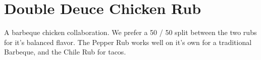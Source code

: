 \section[Double Deuce]{Double Deuce Chicken Rub}\label{double_deuce_rub}

\begin{recipestats}[
        servings=1~\pound,
        preptime=10~\minute,
        original=Kevin \& Mike,
    ]
\end{recipestats}

\begin{recipeabstract}
    A barbeque chicken collaboration.
    We prefer a 50 / 50 split between the two rubs for it's balanced flavor.
    The Pepper Rub works well on it's own for a traditional Barbeque, and the Chile Rub for tacos.
\end{recipeabstract}

\begin{ingredientcolumns}
    \begin{ingredientblock}
        \\
        \\
        \\
        \\
        \\
    \end{ingredientblock}
    \vfill\null
    \columnbreak

    \begin{ingredientblock}
        \\
        \\
        \\
        \\
        \\
        \\
        \\
    \end{ingredientblock}
\end{ingredientcolumns}

